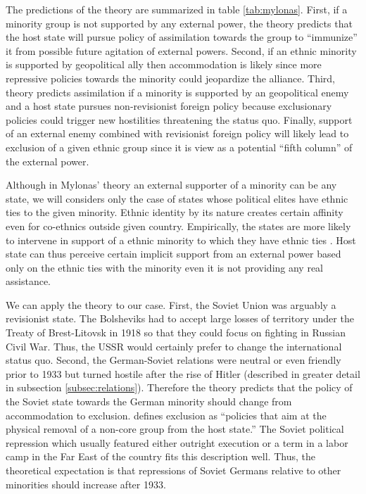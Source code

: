 The predictions of the theory are summarized in table \ref{tab:mylonas}. First, if a minority group is not supported by any external power, the theory predicts that the host state will pursue policy of assimilation towards the group to \enquote{immunize} it from possible future  agitation  of external powers. Second, if an ethnic minority is supported by geopolitical ally then accommodation is likely since more repressive policies towards the minority could jeopardize the alliance. Third, theory predicts assimilation if a minority is supported by an geopolitical enemy and a host state pursues non-revisionist foreign policy because exclusionary policies could trigger new hostilities threatening the status quo. 
Finally, support of an external enemy combined with revisionist foreign policy will likely lead to exclusion of a given ethnic group since it is view as a potential \enquote{fifth column} of the external power. 




Although in Mylonas' theory an  external supporter of a minority can be any state, 
we will considers only the  case of states whose political elites have ethnic ties to the given minority.  
Ethnic identity by its nature creates certain affinity even for co-ethnics outside given country. Empirically, the states are more likely to intervene in support of a 
ethnic minority to which they have ethnic ties \citet{saideman_ties_2001, saideman_discrimination_2002}. 
Host state can thus perceive certain implicit support from an external power based only on  the ethnic ties with the minority even it is not providing any real assistance. 


We can apply the theory to our case. First, the Soviet Union was arguably a revisionist state. The Bolsheviks had to accept large losses of territory under the Treaty of Brest-Litovsk in 1918 so that they could focus on fighting in Russian Civil War. Thus, the USSR would certainly prefer to change the international status quo. Second, the German-Soviet relations were neutral or even  friendly prior to 1933 but turned hostile after the rise of Hitler (described in greater detail in subsection \ref{subsec:relations}). Therefore the theory predicts that the policy of the Soviet state towards the German minority should change from accommodation to exclusion. \citet[p. 22]{mylonas_politics_2013} defines exclusion as \enquote{policies that aim at the physical removal of a non-core group from the host state.} The Soviet political repression which usually featured either outright execution or a term in a labor camp in the Far East of the country fits this description well. Thus, the theoretical expectation is that  repressions of Soviet Germans relative to other minorities should increase after 1933.  


